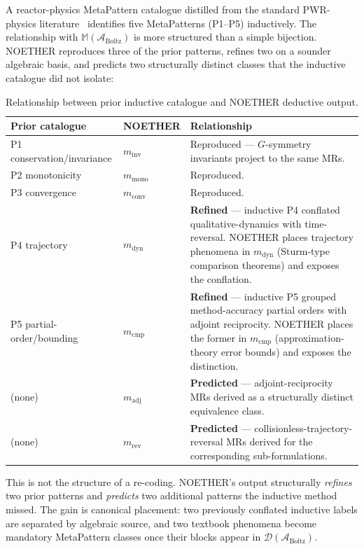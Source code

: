 \documentclass[acmsmall, screen]{acmart}
\begin{document}
A reactor-physics MetaPattern catalogue distilled from the standard PWR-physics literature~\cite{BellGlasstone1970, LewisMiller1993} identifies five MetaPatterns (P1--P5) inductively. The relationship with $\mathbb{M}(\mathcal{A}_{\mathrm{Boltz}})$ is more structured than a simple bijection. NOETHER reproduces three of the prior patterns, refines two on a sounder algebraic basis, and predicts two structurally distinct classes that the inductive catalogue did not isolate:

\begin{table}[h]
\centering
\caption{Relationship between prior inductive catalogue and NOETHER deductive output.}
\label{tab:refinement}
\small
\begin{tabular}{p{} p{} p{}}
\toprule
\textbf{Prior catalogue} & \textbf{NOETHER} & \textbf{Relationship} \\
\midrule
P1 conservation/invariance & $m_{\mathrm{inv}}$ & Reproduced --- $G$-symmetry invariants project to the same MRs. \\
P2 monotonicity & $m_{\mathrm{mono}}$ & Reproduced. \\
P3 convergence & $m_{\mathrm{conv}}$ & Reproduced. \\
P4 trajectory & $m_{\mathrm{dyn}}$ & \textbf{Refined} --- inductive P4 conflated qualitative-dynamics with time-reversal. NOETHER places trajectory phenomena in $m_{\mathrm{dyn}}$ (Sturm-type comparison theorems) and exposes the conflation. \\
P5 partial-order/bounding & $m_{\mathrm{cmp}}$ & \textbf{Refined} --- inductive P5 grouped method-accuracy partial orders with adjoint reciprocity. NOETHER places the former in $m_{\mathrm{cmp}}$ (approximation-theory error bounds) and exposes the distinction. \\
(none) & $m_{\mathrm{adj}}$ & \textbf{Predicted} --- adjoint-reciprocity MRs derived as a structurally distinct equivalence class. \\
(none) & $m_{\mathrm{rev}}$ & \textbf{Predicted} --- collisionless-trajectory-reversal MRs derived for the corresponding sub-formulations. \\
\bottomrule
\end{tabular}
\end{table}

This is not the structure of a re-coding. NOETHER's output structurally \emph{refines} two prior patterns and \emph{predicts} two additional patterns the inductive method missed. The gain is canonical placement: two previously conflated inductive labels are separated by algebraic source, and two textbook phenomena become mandatory MetaPattern classes once their blocks appear in $\mathcal{D}(\mathcal{A}_{\mathrm{Boltz}})$.
\end{document}
